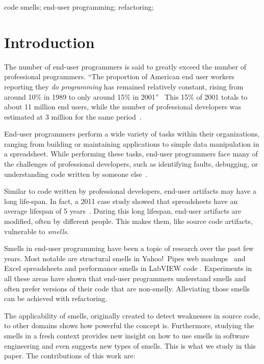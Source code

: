\documentclass[10pt,conference,compsocconf]{IEEEtran}
\begin{document}
\begin{IEEEkeywords}
code smells;
end-user programming;
refactoring;
\end{IEEEkeywords}

\section{Introduction}
The number of end-user programmers is said to greatly exceed the number of professional programmers. ``The proportion of American end user workers reporting they \emph{do programming} has remained relatively constant, rising from around 10\% in 1989 to only around 15\% in 2001''~\cite{Scaf2005} This 15\% of 2001 totals to about 11 million end users, while the number of professional developers was estimated at 3 million for the same period~\cite{Scaf2005}.

End-user programmers perform a wide variety of tasks within their organizations, ranging from building or maintaining applications to simple data manipulation in a spreadsheet. While performing these tasks, end-user programmers face many of the challenges of professional developers, such as identifying faults, debugging, or understanding code written by someone else~\cite{Ko2011}.

Similar to code written by professional developers, end-user artifacts may have a long life-span. In fact, a 2011 case study showed that spreadsheets have an average lifespan of 5 years~\cite{Hermans2011}. During this long lifespan, end-user artifacts are modified, often by different people. This makes them, like source code artifacts, vulnerable to \emph{smells}. 

Smells in end-user programming have been a topic of research over the past few years. Most notable are structural smells in Yahoo!\ Pipes web mashups~\cite{Stolee2011} and  Excel spreadsheets \cite{Hermans2012inter} and performance smells in LabVIEW code \cite{chambers2013smell}.
Experiments in all these areas have shown that end-user programmers understand smells and often prefer versions of their code that are non-smelly.
Alleviating those smells can be achieved with refactoring.

The applicability of smells, originally created to detect weaknesses in source code, to other domains shows how powerful the concept is. Furthermore, studying the smells in a fresh context  provides new insight on how to use smells in software engineering and  even suggests new types of smells. This is what we study in this paper.
The contributions of this work are:
\end{document}
